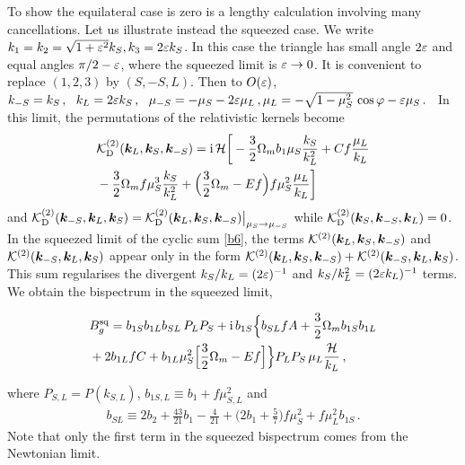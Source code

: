 To show the equilateral case is zero is a lengthy calculation involving many cancellations.  Let us illustrate instead the squeezed case. We write $k_1=k_2=\sqrt{1+\varepsilon^2}k_S, k_3=2\varepsilon k_S$.
In this case the triangle has small angle $2\varepsilon$ and equal angles $\pi/2-\varepsilon$, where the squeezed limit is $\varepsilon\to0$. It is convenient to replace $(1,2,3)$ by $(S,-S,L)$.
Then to $O(\varepsilon)$,
$%
k_{-S}= k_{S}\,,~~k_L=2\ep k_S\,,~~  
\mu_{-S}=-\mu_S-2\ep\mu_L\,,
\mu_L = -\sqrt{1-\mu_S^2}\,\cos\varphi - {\ep\mu_S}\,.
$%
 ~In this limit, the permutations of the relativistic kernels become
\begin{align}
& {\cal K}^{(2)}_{\mathrm{D}}(\bm {k}_L,\bm {k}_S,\bm {k}_{-S}) = \mathrm{i\,} {\mathcal{H}}
{\bigg[- \frac{3}{2}\Omega_m b_1\mu_S \frac{k_S}{k_L^2}+ C f \frac{\mu_L}{k_L} }
\nonumber\\
& - \frac{3}{2} \Omega_m f\mu_S^3 \frac{k_S}{k_L^2} +\Big( \frac{3}{2} \Omega_m- Ef \Big) f\mu_S^2 \frac{\mu_L}{k_L}\bigg] 
\label{k2d1} 
\end{align}
and $ {\cal K}^{(2)}_{\mathrm{D}}(\bm {k}_{-S},\bm {k}_L,\bm {k}_S) =  {\cal K}^{(2)}_{\mathrm{D}}(\bm {k}_L,\bm {k}_S,\bm {k}_{-S})\big|_{\mu_S\to {\mu_{-S}}}$ while ${\cal K}^{(2)}_{\mathrm{D}}(\bm {k}_S,\bm {k}_{-S},\bm {k}_L) =0$. 
In the squeezed limit of the cyclic sum  \eqref{b6}, the terms $ {\cal K}^{(2)}(\bm {k}_L,\bm {k}_S,\bm {k}_{-S})$ and  ${\cal K}^{(2)}(\bm {k}_{-S},\bm {k}_L,\bm {k}_S)$ appear only in the form ${\cal K}^{(2)}(\bm {k}_L,\bm {k}_S,\bm {k}_{-S})+{\cal K}^{(2)}(\bm {k}_{-S},\bm {k}_L,\bm {k}_S)$. This sum regularises
the divergent $k_S/k_L=(2\varepsilon)^{-1}$ and $k_S/k_L^2=(2\varepsilon k_L)^{-1}$ terms.  We obtain the bispectrum in the squeezed limit,


\begin{align}
&B_{g}^{\mathrm{sq}} = b_{1S}b_{1L}b_{SL}\, P_LP_S+\mathrm{i\,} b_{1S}\Big\{b_{SL}f A + {\frac{3}{2}} \Omega_m b_{1S}b_{1L} 
\nonumber\\
&+2b_{1L}f C+ b_{1L}\mu_S^2\Big[{\frac{3}{2}}\Omega_m- Ef \Big] \Big\}P_LP_S\,\mu_L \frac{\mathcal{H}}{k_L} \,,\label{bgd}
\end{align}


where $P_{S,L}=P(k_{S,L})$, $b_{1S,L}\equiv  b_1+f\mu_{S,L}^2$ and
\begin{align}
b_{SL} \equiv 2b_2+ \frac{43}{21}b_1 - \frac{4}{21}
+\Big(2b_1+ \frac{5}{7}\Big)f\mu_S^2%
+f\mu_L^2 b_{1S}
\,. \nonumber\label{bsl}
\end{align}
Note that only the first term in the squeezed bispectrum comes from the Newtonian limit. 


